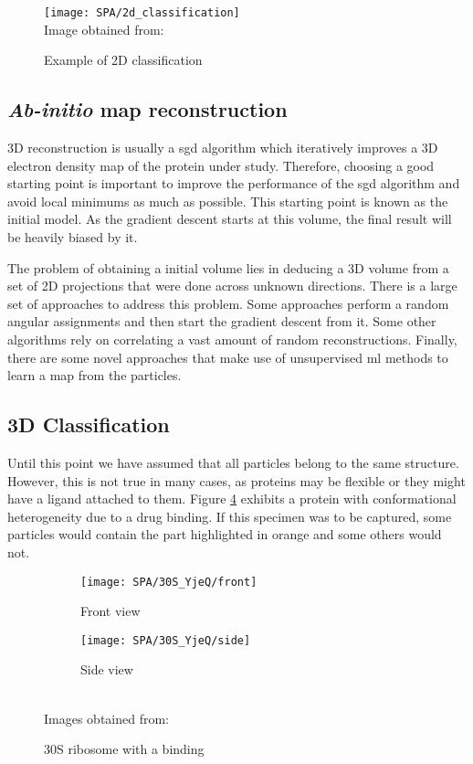 \documentclass[../main.tex]{subfiles}
\begin{document}
\begin{figure}[htbp]
    \centering
    \texttt{[image: SPA/2d\_classification]}\\
    Image obtained from: \cite{greg}
    \caption{Example of 2D classification}
    \label{fig:2:2d_classification}
\end{figure}

\subsection{\textit{Ab-initio} map reconstruction}
3D reconstruction is usually a \gls{sgd} algorithm which iteratively improves a 3D electron density map of the protein under study. Therefore, choosing a good starting point is important to improve the performance of the \gls{sgd} algorithm and avoid local minimums as much as possible. This starting point is known as the initial model. As the gradient descent starts at this volume, the final result will be heavily biased by it\cite{sigworth2015}.

The problem of obtaining a initial volume lies in deducing a 3D volume from a set of 2D projections that were done across unknown directions. There is a large set of approaches to address this problem. Some approaches perform a random angular assignments and then start the gradient descent from it. Some other algorithms rely on correlating a vast amount of random reconstructions\cite{vargas2014}. Finally, there are some novel approaches that make use of unsupervised \gls{ml} methods to learn a map from the particles\cite{levy2022}.

\subsection{3D Classification}
Until this point we have assumed that all particles belong to the same structure. However, this is not true in many cases, as proteins may be flexible or they might have a ligand attached to them. Figure \ref{fig:2:30s_yjeq} exhibits a protein with conformational heterogeneity due to a drug binding. If this specimen was to be captured, some particles would contain the part highlighted in orange and some others would not.

\begin{figure}[htbp]
    \centering
    \begin{subfigure}[b]{0.3\textwidth}
         \centering
         \texttt{[image: SPA/30S\_YjeQ/front]}
         \caption{Front view}
         \label{fig:2:30s_yjeq:front}
    \end{subfigure}
    \begin{subfigure}[b]{0.3\textwidth}
         \centering
         \texttt{[image: SPA/30S\_YjeQ/side]}
         \caption{Side view}
         \label{fig:2:30s_yjeq:side}
    \end{subfigure}\\
    Images obtained from: \cite{razi2017}
    \caption{30S ribosome with a binding}
    \label{fig:2:30s_yjeq}
\end{figure}
\end{document}
